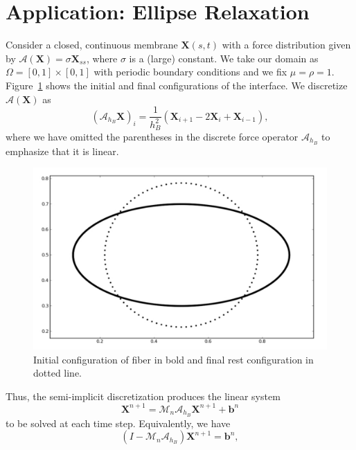 \documentclass[preprint,12pt]{elsarticle}
\begin{document}
\section{Application: Ellipse Relaxation}
\label{Sec:drop}
Consider a closed, continuous membrane $\mathbf{X}(s,t)$ with a force distribution given by $\mathcal{A}(\mathbf{X})=\sigma\mathbf{X}_{ss}$, where $\sigma$ is a (large) constant. We take our domain as $\Omega = [0,1]\times[0,1]$ with periodic boundary conditions and we fix $\mu=\rho=1$. Figure~\ref{fig:Ellipse} shows the initial and final configurations of the interface.
We discretize $\mathcal{A}(\mathbf{X})$ as
\begin{equation}
\left(\mathcal{A}_{h_B}\mathbf{X}\right)_i = \frac{1}{h_B^2}\left(\mathbf{X}_{i+1}-2\mathbf{X}_i+\mathbf{X}_{i-1}\right),
\label{eqn:LinearForce}
\end{equation}
where we have omitted the parentheses in the discrete force operator $\mathcal{A}_{h_B}$ to emphasize that it is linear.
\begin{figure}[!b]
  \begin{center}
    \includegraphics[bb=0in 0in 7.7in 4.8in,width=4.8in,clip]{Ellipse.pdf}
  \end{center}
  \caption{\small Initial configuration of fiber in bold and final rest configuration in dotted line.}
  \label{fig:Ellipse}
\end{figure}
Thus, the semi-implicit discretization produces the linear system
\begin{equation}
\mathbf{X}^{n+1} = \mathcal{M}_n\mathcal{A}_{h_B} \mathbf{X}^{n+1} + \mathbf{b}^n
\end{equation}
 to be solved at each time step. Equivalently, we have
\begin{equation}
(\mathit{I}- \mathcal{M}_n\mathcal{A}_{h_B}) \mathbf{X}^{n+1} = \mathbf{b}^n,
\label{eq:LinearSystem}
\end{equation}
\end{document}
